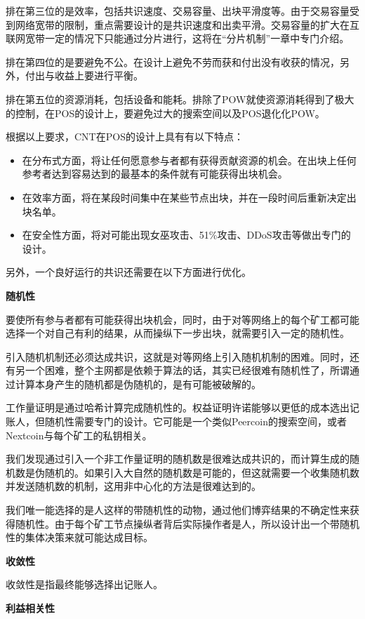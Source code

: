 \documentclass[a4paper,12pt]{article}
\begin{document}
排在第三位的是效率，包括共识速度、交易容量、出块平滑度等。由于交易容量受到网络宽带的限制，重点需要设计的是共识速度和出卖平滑。交易容量的扩大在互联网宽带一定的情况下只能通过分片进行，这将在“分片机制”一章中专门介绍。

排在第四位的是要避免不公。在设计上避免不劳而获和付出没有收获的情况，另外，付出与收益上要进行平衡。

排在第五位的资源消耗，包括设备和能耗。排除了POW就使资源消耗得到了极大的控制，在POS的设计上，要避免过大的搜索空间以及POS退化化POW。

根据以上要求，CNT在POS的设计上具有有以下特点：

\begin{itemize}
\item 在分布式方面，将让任何愿意参与者都有获得贡献资源的机会。在出块上任何参考者达到容易达到的最基本的条件就有可能获得出块机会。
\item 在效率方面，将在某段时间集中在某些节点出块，并在一段时间后重新决定出块名单。
\item 在安全性方面，将对可能出现女巫攻击、51\%攻击、DDoS攻击等做出专门的设计。
\end{itemize}

另外，一个良好运行的共识还需要在以下方面进行优化。

\textbf{随机性}

要使所有参与者都有可能获得出块机会，同时，由于对等网络上的每个矿工都可能选择一个对自己有利的结果，从而操纵下一步出块，就需要引入一定的随机性。

引入随机机制还必须达成共识，这就是对等网络上引入随机机制的困难。同时，还有另一个困难，整个主网都是依赖于算法的话，其实已经很难有随机性了，所谓通过计算本身产生的随机都是伪随机的，是有可能被破解的。

工作量证明是通过哈希计算完成随机性的。权益证明许诺能够以更低的成本选出记账人，但随机性需要专门的设计。它可能是一个类似Peercoin的搜索空间，或者Nextcoin与每个矿工的私钥相关。

我们发现通过引入一个非工作量证明的随机数是很难达成共识的，而计算生成的随机数是伪随机的。如果引入大自然的随机数是可能的，但这就需要一个收集随机数并发送随机数的机制，这用非中心化的方法是很难达到的。

我们唯一能选择的是人这样的带随机性的动物，通过他们博弈结果的不确定性来获得随机性。由于每个矿工节点操纵者背后实际操作者是人，所以设计出一个带随机性的集体决策来就可能达成目标。

\textbf{收敛性}

收敛性是指最终能够选择出记账人。

\textbf{利益相关性}
\end{document}
